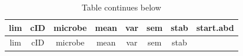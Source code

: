 \documentclass[]{article}
\begin{document}
\begin{longtable}[]{@{}cccccccc@{}}
\caption{Table continues below}\tabularnewline
\toprule
\begin{minipage}[b]{0.07\columnwidth}\centering\strut
lim
\strut\end{minipage} &
\begin{minipage}[b]{0.07\columnwidth}\centering\strut
cID
\strut\end{minipage} &
\begin{minipage}[b]{0.11\columnwidth}\centering\strut
microbe
\strut\end{minipage} &
\begin{minipage}[b]{0.11\columnwidth}\centering\strut
mean
\strut\end{minipage} &
\begin{minipage}[b]{0.11\columnwidth}\centering\strut
var
\strut\end{minipage} &
\begin{minipage}[b]{0.11\columnwidth}\centering\strut
sem
\strut\end{minipage} &
\begin{minipage}[b]{0.08\columnwidth}\centering\strut
stab
\strut\end{minipage} &
\begin{minipage}[b]{0.12\columnwidth}\centering\strut
start.abd
\strut\end{minipage}\tabularnewline
\midrule
\endfirsthead
\toprule
\begin{minipage}[b]{0.07\columnwidth}\centering\strut
lim
\strut\end{minipage} &
\begin{minipage}[b]{0.07\columnwidth}\centering\strut
cID
\strut\end{minipage} &
\begin{minipage}[b]{0.11\columnwidth}\centering\strut
microbe
\strut\end{minipage} &
\begin{minipage}[b]{0.11\columnwidth}\centering\strut
mean
\strut\end{minipage} &
\begin{minipage}[b]{0.11\columnwidth}\centering\strut
var
\strut\end{minipage} &
\begin{minipage}[b]{0.11\columnwidth}\centering\strut
sem
\strut\end{minipage} &
\begin{minipage}[b]{0.08\columnwidth}\centering\strut
stab
\strut\end{minipage} &

\end{longtable}
\end{document}
